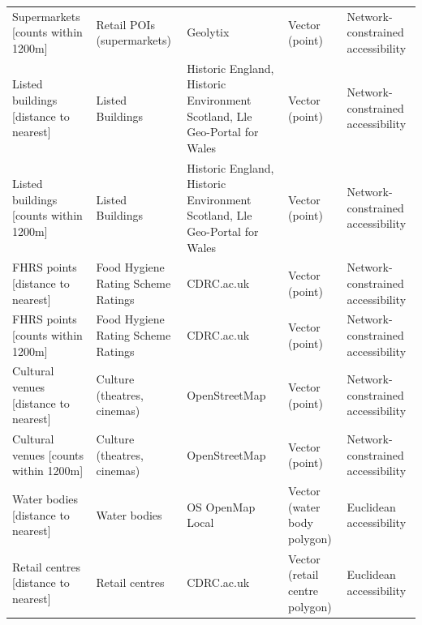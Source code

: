 \documentclass[fleqn,10pt]{wlscirep}
\begin{document}
\begin{longtable}{p{}p{}p{}p{}p{}}
                                                                        Supermarkets [counts within 1200m] &         Retail POIs (supermarkets)  &                                                                   Geolytix  &                    Vector (point)  &              Network-constrained accessibility  \\
                                                                    Listed buildings [distance to nearest] &                   Listed Buildings  &  Historic England, Historic Environment Scotland, Lle Geo-Portal for Wales  &                    Vector (point)  &              Network-constrained accessibility  \\
                                                                    Listed buildings [counts within 1200m] &                   Listed Buildings  &  Historic England, Historic Environment Scotland, Lle Geo-Portal for Wales  &                    Vector (point)  &              Network-constrained accessibility  \\
                                                                        FHRS points [distance to nearest] & Food Hygiene Rating Scheme Ratings  &                                                                 CDRC.ac.uk  &                    Vector (point)  &              Network-constrained accessibility  \\
                                                                        FHRS points [counts within 1200m] & Food Hygiene Rating Scheme Ratings  &                                                                 CDRC.ac.uk  &                    Vector (point)  &              Network-constrained accessibility  \\
                                                                    Cultural venues [distance to nearest] &        Culture (theatres, cinemas)  &                                                              OpenStreetMap  &                    Vector (point)  &              Network-constrained accessibility  \\
                                                                    Cultural venues [counts within 1200m] &        Culture (theatres, cinemas)  &                                                              OpenStreetMap  &                    Vector (point)  &              Network-constrained accessibility  \\
                                                                        Water bodies [distance to nearest] &                       Water bodies  &                                                           OS OpenMap Local  &       Vector (water body polygon)  &                        Euclidean accessibility  \\
                                                                    Retail centres [distance to nearest] &                     Retail centres  &                                                                 CDRC.ac.uk  &    Vector (retail centre polygon)  &                        Euclidean accessibility  \\
\end{longtable}
\end{document}
